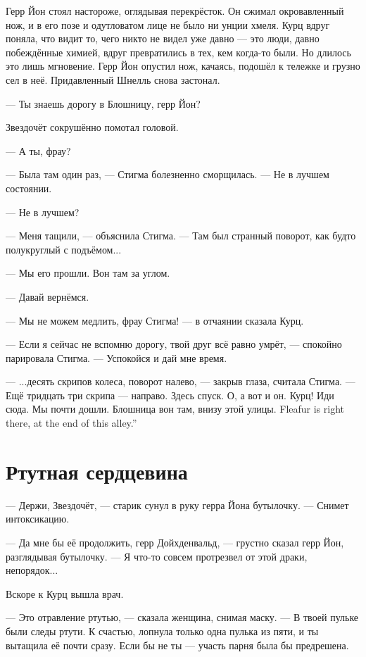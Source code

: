 Герр Йон стоял настороже, оглядывая перекрёсток.
Он сжимал окровавленный нож, и в его позе и одутловатом лице не было ни унции хмеля.
Курц вдруг поняла, что видит то, чего никто не видел уже давно --- это люди, давно побеждённые химией, вдруг превратились в тех, кем когда-то были.
Но длилось это лишь мгновение.
Герр Йон опустил нож, качаясь, подошёл к тележке и грузно сел в неё.
Придавленный Шнелль снова застонал.

--- Ты знаешь дорогу в Блошницу, герр Йон?

Звездочёт сокрушённо помотал головой.

--- А ты, фрау?

--- Была там один раз, --- Стигма болезненно сморщилась.
--- Не в лучшем состоянии.

--- Не в лучшем?

--- Меня тащили, --- объяснила Стигма.
--- Там был странный поворот, как будто полукруглый с подъёмом...

--- Мы его прошли.
Вон там за углом.

--- Давай вернёмся.

--- Мы не можем медлить, фрау Стигма! --- в отчаянии сказала Курц.

--- Если я сейчас не вспомню дорогу, твой друг всё равно умрёт, --- спокойно парировала Стигма.
--- Успокойся и дай мне время.

--- ...десять скрипов колеса, поворот налево, --- закрыв глаза, считала Стигма.
--- Ещё тридцать три скрипа --- направо.
Здесь спуск.
О, а вот и он.
Курц!
Иди сюда.
Мы почти дошли.
{Блошница вон там, внизу этой улицы.}
{Fleafur is right there, at the end of this alley.''} %

\section{Ртутная сердцевина}

--- Держи, Звездочёт, --- старик сунул в руку герра Йона бутылочку.
--- Снимет интоксикацию.

--- Да мне бы её продолжить, герр Дойхденвальд, --- грустно сказал герр Йон, разглядывая бутылочку.
--- Я что-то совсем протрезвел от этой драки, непорядок...

Вскоре к Курц вышла врач.

--- Это отравление ртутью, --- сказала женщина, снимая маску.
--- В твоей пульке были следы ртути.
К счастью, лопнула только одна пулька из пяти, и ты вытащила её почти сразу.
Если бы не ты --- участь парня была бы предрешена.

